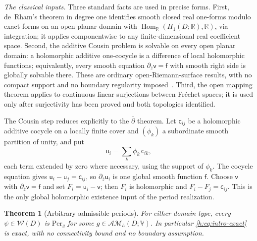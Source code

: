 \documentclass[11pt,a4paper]{article}
\numberwithin{equation}{section}
\newtheorem{theorem}{Theorem}[section]
\theoremstyle{definition}
\theoremstyle{remark}
\theoremstyle{plain}
\newcommand{\RR}{\mathbb R}
\newcommand{\AM}{\mathcal{AM}}
\newcommand{\Per}{\mathrm{Per}}
\newcommand{\VV}{\mathbb V}                       %
\begin{document}
\emph{The classical inputs.} Three standard facts are used in precise forms.
First, de~Rham's theorem in degree one identifies smooth closed real one-forms
modulo exact forms on an open planar domain with
$\operatorname{Hom}_\RR(H_1(D;\RR),\RR)$, via integration; it applies
componentwise to any finite-dimensional real coefficient space. Second, the
additive Cousin problem is solvable on every open planar domain: a holomorphic
additive one-cocycle is a difference of local holomorphic functions;
equivalently, every smooth equation $\partial_{\bar z}\mathsf v=\mathsf f$ with
smooth right side is globally solvable there. These are ordinary
open-Riemann-surface results, with no compact support and no boundary
regularity imposed~\cite{Forster}. Third, the open mapping theorem applies to
continuous linear surjections between Fr\'echet spaces; it is used only after
surjectivity has been proved and both topologies identified.

The Cousin step reduces explicitly to the $\bar\partial$ theorem. Let
$\mathsf c_{ij}$ be a holomorphic additive cocycle on a locally finite cover and
$(\phi_k)$ a subordinate smooth partition of unity, and put
\begin{equation}\label{h:eq:Cousin-partition}
 \mathsf u_i=\sum_k\phi_k\,\mathsf c_{ik},
\end{equation}
each term extended by zero where necessary, using the support of $\phi_k$. The
cocycle equation gives $\mathsf u_i-\mathsf u_j=\mathsf c_{ij}$, so
$\partial_{\bar z}\mathsf u_i$ is one global smooth function $\mathsf f$. Choose
$\mathsf v$ with $\partial_{\bar z}\mathsf v=\mathsf f$ and set
$F_i=\mathsf u_i-\mathsf v$; then $F_i$ is holomorphic and
$F_i-F_j=\mathsf c_{ij}$. This is the only global holomorphic existence input
of the period realization.

\begin{theorem}[Arbitrary admissible periods]\label{h:thm:surjectivity}
For either domain type, every $\psi\in\mathscr W(D)$ is $\Per_g$ for some
$g\in\AM_h(D;\VV)$. In particular \eqref{h:eq:intro-exact} is exact, with no
connectivity bound and no boundary assumption.
\end{theorem}
\end{document}
